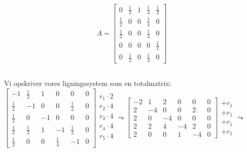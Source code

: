 \documentclass[a4paper,12pt]{article}
\begin{document}
\[
A =
\left[\begin{array}{ccccc}
    0 & \frac{1}{2} & 1 & \frac{1}{4} & \frac{1}{2} \\
    \frac{1}{2} & 0 & 0 & \frac{1}{4} & 0 \\
    \frac{1}{2} & 0 & 0 & \frac{1}{4} & 0 \\
    0 & 0 & 0 & 0 & \frac{1}{2} \\
    0 & \frac{1}{2} & 0 & \frac{1}{4} & 0
\end{array}\right]
\]

\subsection{}
Vi opskriver vores ligningssystem som en totalmatrix:\\
$
\left[\begin{array}{ccccc|c}
    -1 & \frac{1}{2} & 1 & 0 & 0 & 0 \\
    \frac{1}{2} & -1 & 0 & 0 & \frac{1}{2} & 0 \\
    \frac{1}{2} & 0 & -1 & 0 & 0 & 0 \\
    \frac{1}{2} & \frac{1}{2} & 1 & -1 & \frac{1}{2} & 0 \\
    \frac{1}{2} & 0 & 0 & \frac{1}{4} & -1 & 0
\end{array}\right]
\begin{array}{ccccc}
    r_1 \cdot 2\\
    r_2 \cdot 4\\
    r_3 \cdot 4\\
    r_4 \cdot 4\\
    r_5 \cdot 4\\
\end{array}
\leadsto
\left[\begin{array}{ccccc|c}
    -2 & 1 & 2 & 0 & 0 & 0 \\
    2 & -4 & 0 & 0 & 2 & 0 \\
    2 & 0 & -4 & 0 & 0 & 0 \\
    2 & 2 & 4 & -4 & 2 & 0 \\
    2 & 0 & 0 & 1 & -4 & 0
\end{array}\right]
\begin{array}{ccccc}
    \\
    +r_1\\
    +r_1\\
    +r_1\\
    +r_1\\
\end{array}
\leadsto
$\\
\end{document}
